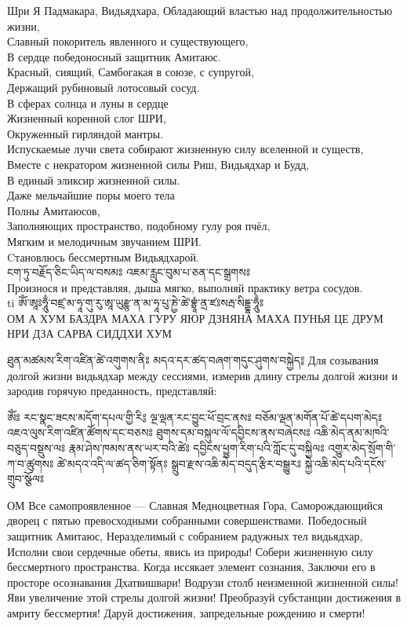 Шри   Я Падмакара, Видьядхара, 
\indent   Обладающий властью над продолжительностью жизни,\\
Славный покоритель явленного и существующего,\\
В сердце победоносный защитник Амитаюс.\\
Красный, сиящий, Самбогакая в союзе, с супругой,\\
Держащий рубиновый лотосовый сосуд.\\
В сферах солнца и луны в сердце\\
Жизненный коренной слог ШРИ,\\
Окруженный гирляндой мантры.\\
Испускаемые лучи света собирают жизненную силу вселенной и существ,\\
Вместе с некратором жизненной силы Риш, Видьядхар и Будд,\\
В единый эликсир жизненной силы.\\
Даже мельчайшие поры моего тела\\
Полны Амитаюсов,\\
Заполняющих пространство, подобному гулу роя пчёл,\\
Мягким и мелодичным звучанием ШРИ.\\
Cтановлюсь бессмертным Видьядхарой.\\

{\ti ངག་ཏུ་བརྗོད་ཅིང་ཡིད་ལ་བསམཿ  འཇམ་རླུང་བུམ་པ་ཅན་དང་སྒྲགསཿ }\\
Произнося и представляя, дыша мягко, выполняй практику ветра сосудов.\\

{ti ཨོཾ་ཨཱཿཧཱུྃ་བཛྲ་མ་ཧཱ་གུ་རུ་ཨཱ་ཡུརྫྙ་ན་མ་ཧཱ་པུ་ཎྱེ་ཚེ་བྷྲཱཾ་ནྲ་ཛཿསརྦ་སིདྡྷ་ཧཱུྃཿ }\\
ОМ А ХУМ БАЗДРА МАХА ГУРУ ЯЮР ДЗНЯНА МАХА ПУНЬЯ ЦЕ ДРУМ НРИ ДЗА САРВА СИДДХИ ХУМ

ཐུན་མཚམས་རིག་འཛིན་ཚེ་འགུགས་ནིཿ མདའ་དར་ཚད་བཞག་གདུང་ཤུགས་བསྐྱེད༔ 
Для созывания долгой жизни видьядхар между сессиями, измерив длину стрелы долгой жизни и зародив горячую преданность, представляй:

ཨོཾཿ རང་སྣང་ཟངས་མདོག་དཔལ་གྱི་རི༔ 
ལྔ་ལྡན་རང་བྱུང་ཕོ་བྲང་ནསཿ 
བཅོམ་ལྡན་མགོན་པོ་ཚེ་དཔག་མེདཿ 
འཇའ་ལུས་རིག་འཛིན་ཚོགས་དང་བཅསཿ 
ཐུགས་དམ་བསྐུལ་ལོ་དབྱིངས་ནས་བཞེངསཿ
འཆི་མེད་ནམ་མཁའི་བཅུད་བསྡུས་ལཿ 
རྣམ་ཤེས་ཁམས་ནས་ཡར་བའི་ཚེཿ 
དབྱིངས་ཕྱུག་རིག་པའི་ཀློང་དུ་བསྐྱིལཿ 
འགྱུར་མེད་སྲོག་གི་ཀ་བ་ཚུགསཿ 
ཚེ་མདའ་འདི་ལ་ཚད་ཅིག་སྟོནཿ 
སྒྲུབ་རྫས་འཆི་མེད་བདུད་རྩིར་བསྒྱུརཿ 
སྐྱེ་འཆི་མེད་པའི་དངོས་གྲུབ་སྩོལཿ 

ОМ  Все самопроявленное — Славная Медноцветная Гора,
Саморождающийся дворец с пятью превосходными собранными совершенствами.
Победосный защитник Амитаюс, 
Неразделимый с собранием радужных тел видьядхар,
Исполни свои сердечные обеты, явись из природы!
Собери жизненную силу бессмертного пространства.
Когда иссякает элемент сознания,
Заключи его в просторе осознавания Дхатвишвари!
Водрузи столб неизменной жизненной силы!
Яви увеличение этой стрелы долгой жизни!
Преобразуй субстанции достижения в амриту бессмертия!
Даруй достижения, запредельные рождению и смерти!

